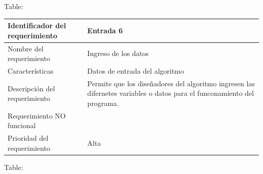 \documentclass[]{article}
\begin{document}
Table:

\begin{longtable}[]{@{}ll@{}}
\toprule
\begin{minipage}[b]{0.39\columnwidth}\raggedright\strut
Identificador del requerimiento\strut
\end{minipage} & \begin{minipage}[b]{0.50\columnwidth}\raggedright\strut
Entrada 6\strut
\end{minipage}\tabularnewline
\midrule
\endhead
\begin{minipage}[t]{0.39\columnwidth}\raggedright\strut
Nombre del requerimiento\strut
\end{minipage} & \begin{minipage}[t]{0.50\columnwidth}\raggedright\strut
Ingreso de los datos\strut
\end{minipage}\tabularnewline
\begin{minipage}[t]{0.39\columnwidth}\raggedright\strut
Características\strut
\end{minipage} & \begin{minipage}[t]{0.50\columnwidth}\raggedright\strut
Datos de entrada del algoritmo\strut
\end{minipage}\tabularnewline
\begin{minipage}[t]{0.39\columnwidth}\raggedright\strut
Descripción del requerimiento\strut
\end{minipage} & \begin{minipage}[t]{0.50\columnwidth}\raggedright\strut
Permite que los diseñadores del algoritmo ingresen las difernetes
variables o datos para el funconamiento del programa.\strut
\end{minipage}\tabularnewline
\begin{minipage}[t]{0.39\columnwidth}\raggedright\strut
Requerimiento NO funcional\strut
\end{minipage} & \begin{minipage}[t]{0.50\columnwidth}\raggedright\strut
\strut
\end{minipage}\tabularnewline
\begin{minipage}[t]{0.39\columnwidth}\raggedright\strut
Prioridad del requerimiento\strut
\end{minipage} & \begin{minipage}[t]{0.50\columnwidth}\raggedright\strut
Alta\strut
\end{minipage}\tabularnewline
\bottomrule
\end{longtable}

Table:
\end{document}
